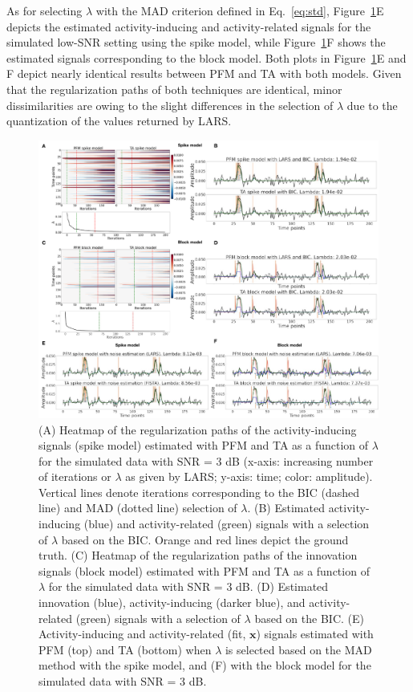 As for selecting $\lambda$ with the MAD criterion defined in Eq.~\eqref{eq:std},
Figure~\ref{fig:sim}E depicts the estimated activity-inducing and
activity-related signals for the simulated low-SNR setting using the spike
model, while Figure~\ref{fig:sim}F shows the estimated signals corresponding to
the block model. Both plots in Figure~\ref{fig:sim}E and F depict nearly
identical results between PFM and TA with both models. Given that the
regularization paths of both techniques are identical, minor dissimilarities are
owing to the slight differences in the selection of $\lambda$ due to the
quantization of the values returned by LARS.

\begin{figure}[t!]
    \begin{center}
        \includegraphics[width=\textwidth]{figures/figure_sim.pdf}
    \end{center}
    \caption{(A) Heatmap of the regularization paths of the activity-inducing
    signals (spike model) estimated with PFM and TA as a function of $\lambda$
    for the simulated data with SNR = 3 dB (x-axis: increasing number of
    iterations or $\lambda$ as given by LARS; y-axis: time; color: amplitude).
    Vertical lines denote iterations corresponding to the BIC (dashed line) and
    MAD (dotted line) selection of $\lambda$. (B) Estimated activity-inducing
    (blue) and activity-related (green) signals with a selection of $\lambda$
    based on the BIC. Orange and red lines depict the ground truth. (C) Heatmap
    of the regularization paths of the innovation signals (block model)
    estimated with PFM and TA as a function of $\lambda$ for the simulated data
    with SNR = 3 dB. (D) Estimated innovation (blue), activity-inducing (darker
    blue), and activity-related (green) signals with a selection of $\lambda$
    based on the BIC. (E) Activity-inducing and activity-related (fit,
    $\mathbf{x}$) signals estimated with PFM (top) and TA (bottom) when
    $\lambda$ is selected based on the MAD method with the spike model, and (F)
    with the block model for the simulated data with SNR = 3 dB.}
\label{fig:sim}
\end{figure}

